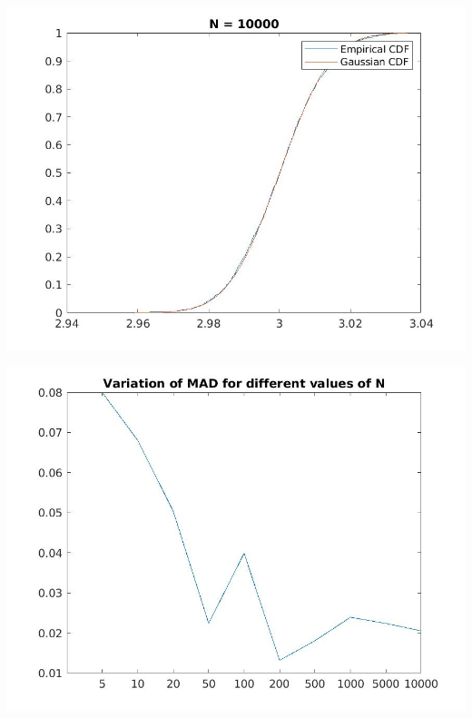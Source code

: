 \documentclass{article}
\theoremstyle{remark}
\begin{document}
\includegraphics[width=\textwidth, height=\textheight, keepaspectratio]{p2_10000.jpg}\par
\includegraphics[width=\textwidth, height=\textheight, keepaspectratio]{p3.jpg}\par
\newpage
\end{document}
